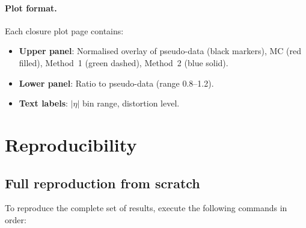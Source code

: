 \documentclass[12pt,a4paper]{article}
\begin{document}
\paragraph{Plot format.}
Each closure plot page contains:
\begin{itemize}[leftmargin=2em]
  \item \textbf{Upper panel}: Normalised overlay of pseudo-data
    (black markers), MC (red filled), Method~1 (green dashed),
    Method~2 (blue solid).
  \item \textbf{Lower panel}: Ratio to pseudo-data (range 0.8--1.2).
  \item \textbf{Text labels}: $|\eta|$ bin range, distortion level.
\end{itemize}

\section{Reproducibility}
\label{sec:reproducibility}

\subsection{Full reproduction from scratch}

To reproduce the complete set of results, execute the following
commands in order:
\end{document}

